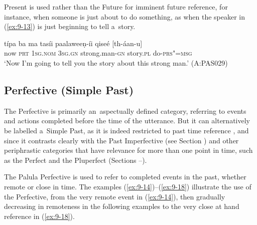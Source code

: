 Present is used rather than the Future for imminent future reference, for instance, when someone is just about to do something, as when the speaker in (\ref{ex:9-13}) is just beginning to tell a~story.

\begin{exe}
\ex
\label{ex:9-13}
\gll típa ba ma tasíi paalaweeṇ-íi qiseé [th-áan-u] \\
now \textsc{prt} 1\textsc{sg.nom} 3\textsc{sg.gn} strong.man-\textsc{gn} story.\textsc{pl} do-\textsc{prs"=msg} \\
\glt `Now I'm going to tell you the story about this strong man.' (A:PAS029)
\end{exe}

\subsection{Perfective (Simple Past)}
\label{subsec:9-1-4}


The Perfective is primarily an~aspectually defined category, referring to events and actions completed before the time of the utterance. But it can alternatively be labelled a~Simple Past, as it is indeed restricted to past time reference \citep[79]{dahl1985}, and since it contrasts clearly with the Past Imperfective (see Section ) and other periphrastic categories that have relevance for more than one point in time, such as the Perfect and the Pluperfect (Sections --).



The Palula Perfective is used to refer to completed events in the past, whether remote or close in time. The examples (\ref{ex:9-14})--(\ref{ex:9-18}) illustrate the use of the Perfective, from the very remote event in (\ref{ex:9-14}), then gradually decreasing in remoteness in the following examples to the very close at hand reference in (\ref{ex:9-18}).

